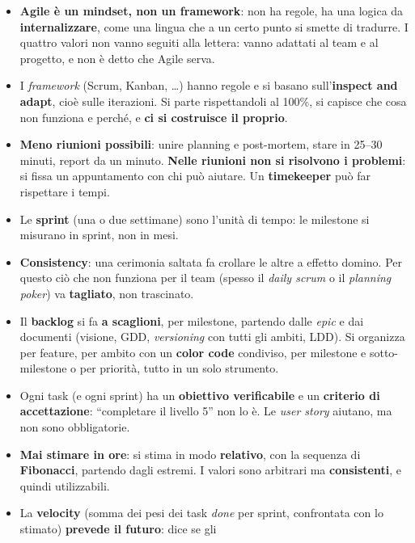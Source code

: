 \begin{itemize}
  \item \textbf{Agile è un mindset, non un framework}: non ha regole, ha una
        logica da \textbf{internalizzare}, come una lingua che a un certo punto
        si smette di tradurre. I quattro valori non vanno seguiti alla lettera:
        vanno adattati al team e al progetto, e non è detto che Agile serva.
  \item I \emph{framework} (Scrum, Kanban, \dots) hanno regole e si basano
        sull'\textbf{inspect and adapt}, cioè sulle iterazioni. Si parte
        rispettandoli al 100\%, si capisce che cosa non funziona e perché, e
        \textbf{ci si costruisce il proprio}.
  \item \textbf{Meno riunioni possibili}: unire planning e post-mortem, stare in
        25--30 minuti, report da un minuto. \textbf{Nelle riunioni non si
        risolvono i problemi}: si fissa un appuntamento con chi può aiutare. Un
        \textbf{timekeeper} può far rispettare i tempi.
  \item Le \textbf{sprint} (una o due settimane) sono l'unità di tempo: le
        milestone si misurano in sprint, non in mesi.
  \item \textbf{Consistency}: una cerimonia saltata fa crollare le altre a
        effetto domino. Per questo ciò che non funziona per il team (spesso il
        \emph{daily scrum} o il \emph{planning poker}) va \textbf{tagliato},
        non trascinato.
  \item Il \textbf{backlog} si fa \textbf{a scaglioni}, per milestone, partendo
        dalle \emph{epic} e dai documenti (visione, GDD, \emph{versioning} con
        tutti gli ambiti, LDD). Si organizza per feature, per ambito con un
        \textbf{color code} condiviso, per milestone e sotto-milestone o per
        priorità, tutto in un solo strumento.
  \item Ogni task (e ogni sprint) ha un \textbf{obiettivo verificabile} e un
        \textbf{criterio di accettazione}: ``completare il livello 5'' non lo è.
        Le \emph{user story} aiutano, ma non sono obbligatorie.
  \item \textbf{Mai stimare in ore}: si stima in modo \textbf{relativo}, con la
        sequenza di \textbf{Fibonacci}, partendo dagli estremi. I valori sono
        arbitrari ma \textbf{consistenti}, e quindi utilizzabili.
  \item La \textbf{velocity} (somma dei pesi dei task \emph{done} per sprint,
        confrontata con lo stimato) \textbf{prevede il futuro}: dice se gli

\end{itemize}
